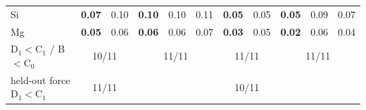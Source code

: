 \begin{table}[t]
\begin{ruledtabular}
\begin{tabular}{lcccccccccc}
Si & \textbf{0.07} & 0.10 & \textbf{0.10} & 0.10 & 0.11 & \textbf{0.05} & 0.05 & \textbf{0.05} & 0.09 & 0.07\\
Mg & \textbf{0.05} & 0.06 & \textbf{0.06} & 0.06 & 0.07 & \textbf{0.03} & 0.05 & \textbf{0.02} & 0.06 & 0.04\\
\hline
D$_1<$C$_1$ / B$<$C$_0$ & \multicolumn{2}{c}{10/11} & \multicolumn{3}{c}{11/11} & \multicolumn{2}{c}{11/11} & \multicolumn{3}{c}{11/11}\\
held-out force D$_1<$C$_1$ & \multicolumn{2}{c}{11/11} & \multicolumn{3}{c}{} & \multicolumn{2}{c}{10/11} & \multicolumn{3}{c}{}\\
\end{tabular}
\end{ruledtabular}
\end{table}
